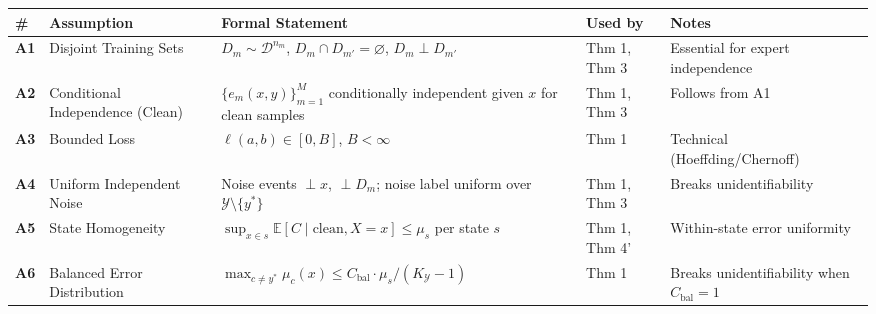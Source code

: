 \documentclass[
  12pt,
]{ctexart}
\begin{document}
\begin{longtable}[]{@{}
  >{\raggedright\arraybackslash}p{}
  >{\raggedright\arraybackslash}p{}
  >{\raggedright\arraybackslash}p{}
  >{\raggedright\arraybackslash}p{}
  >{\raggedright\arraybackslash}p{}@{}}
\toprule\noalign{}
\begin{minipage}[b]{\linewidth}\raggedright
\#
\end{minipage} & \begin{minipage}[b]{\linewidth}\raggedright
Assumption
\end{minipage} & \begin{minipage}[b]{\linewidth}\raggedright
Formal Statement
\end{minipage} & \begin{minipage}[b]{\linewidth}\raggedright
Used by
\end{minipage} & \begin{minipage}[b]{\linewidth}\raggedright
Notes
\end{minipage} \\
\midrule\noalign{}
\endhead
\bottomrule\noalign{}
\endlastfoot
\textbf{A1} & Disjoint Training Sets & \(D_m \sim \mathcal{D}^{n_m}\),
\(D_m \cap D_{m'} = \varnothing\), \(D_m \perp D_{m'}\) & Thm 1, Thm 3 &
Essential for expert independence \\
\textbf{A2} & Conditional Independence (Clean) &
\(\{e_m(x,y)\}_{m=1}^M\) conditionally independent given \(x\) for clean
samples & Thm 1, Thm 3 & Follows from A1 \\
\textbf{A3} & Bounded Loss & \(\ell(a,b) \in [0, B]\), \(B < \infty\) &
Thm 1 & Technical (Hoeffding/Chernoff) \\
\textbf{A4} & Uniform Independent Noise & Noise events \(\perp x\),
\(\perp D_m\); noise label uniform over \(\mathcal{Y}\setminus\{y^*\}\)
& Thm 1, Thm 3 & Breaks unidentifiability \\
\textbf{A5} & State Homogeneity &
\(\sup_{x\in s} \mathbb{E}[C \mid \text{clean}, X=x] \leq \mu_s\) per
state \(s\) & Thm 1, Thm 4' & Within-state error uniformity \\
\textbf{A6} & Balanced Error Distribution &
\(\max_{c\neq y^*} \mu_c(x) \leq C_{\text{bal}} \cdot \mu_s/(K_{\mathcal{Y}}-1)\)
& Thm 1 & Breaks unidentifiability when \(C_{\text{bal}}=1\) \\
\end{longtable}
\end{document}

